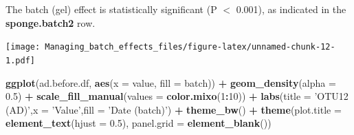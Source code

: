 \documentclass[]{book}
\newenvironment{Shaded}{\begin{snugshade}}{\end{snugshade}}
\newcommand{\KeywordTok}[1]{\textcolor[rgb]{0.13,0.29,0.53}{\textbf{#1}}}
\newcommand{\DataTypeTok}[1]{\textcolor[rgb]{0.13,0.29,0.53}{#1}}
\newcommand{\DecValTok}[1]{\textcolor[rgb]{0.00,0.00,0.81}{#1}}
\newcommand{\FloatTok}[1]{\textcolor[rgb]{0.00,0.00,0.81}{#1}}
\newcommand{\StringTok}[1]{\textcolor[rgb]{0.31,0.60,0.02}{#1}}
\newcommand{\CommentTok}[1]{\textcolor[rgb]{0.56,0.35,0.01}{\textit{#1}}}
\newcommand{\OperatorTok}[1]{\textcolor[rgb]{0.81,0.36,0.00}{\textbf{#1}}}
\newcommand{\NormalTok}[1]{#1}
\begin{document}
The batch (gel) effect is statistically significant (P \(<\) 0.001), as
indicated in the \textbf{sponge.batch2} row.

\begin{Shaded}
\end{Shaded}

\texttt{[image: Managing\_batch\_effects\_files/figure-latex/unnamed-chunk-12-1.pdf]}

\begin{Shaded}
\begin{Highlighting}[]
\KeywordTok{ggplot}\NormalTok{(ad.before.df, }\KeywordTok{aes}\NormalTok{(}\DataTypeTok{x =}\NormalTok{ value, }\DataTypeTok{fill =}\NormalTok{ batch)) }\OperatorTok{+}\StringTok{ }
\StringTok{  }\KeywordTok{geom_density}\NormalTok{(}\DataTypeTok{alpha =} \FloatTok{0.5}\NormalTok{) }\OperatorTok{+}\StringTok{ }\KeywordTok{scale_fill_manual}\NormalTok{(}\DataTypeTok{values =} \KeywordTok{color.mixo}\NormalTok{(}\DecValTok{1}\OperatorTok{:}\DecValTok{10}\NormalTok{)) }\OperatorTok{+}\StringTok{ }
\StringTok{  }\KeywordTok{labs}\NormalTok{(}\DataTypeTok{title =} \StringTok{'OTU12 (AD)'}\NormalTok{,}\DataTypeTok{x =} \StringTok{'Value'}\NormalTok{,}\DataTypeTok{fill =} \StringTok{'Date (batch)'}\NormalTok{) }\OperatorTok{+}\StringTok{ }
\StringTok{  }\KeywordTok{theme_bw}\NormalTok{() }\OperatorTok{+}\StringTok{ }\KeywordTok{theme}\NormalTok{(}\DataTypeTok{plot.title =} \KeywordTok{element_text}\NormalTok{(}\DataTypeTok{hjust =} \FloatTok{0.5}\NormalTok{), }
                     \DataTypeTok{panel.grid =} \KeywordTok{element_blank}\NormalTok{())}
\end{Highlighting}
\end{Shaded}
\end{document}
